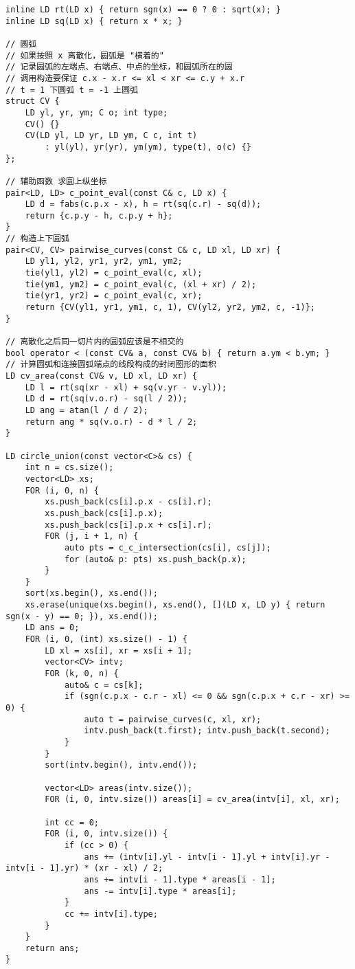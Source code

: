 \documentclass[]{article}
\begin{document}
\begin{verbatim}
inline LD rt(LD x) { return sgn(x) == 0 ? 0 : sqrt(x); }
inline LD sq(LD x) { return x * x; }

// 圆弧
// 如果按照 x 离散化，圆弧是 "横着的"
// 记录圆弧的左端点、右端点、中点的坐标，和圆弧所在的圆
// 调用构造要保证 c.x - x.r <= xl < xr <= c.y + x.r
// t = 1 下圆弧 t = -1 上圆弧
struct CV {
    LD yl, yr, ym; C o; int type;
    CV() {}
    CV(LD yl, LD yr, LD ym, C c, int t)
        : yl(yl), yr(yr), ym(ym), type(t), o(c) {}
};

// 辅助函数 求圆上纵坐标
pair<LD, LD> c_point_eval(const C& c, LD x) {
    LD d = fabs(c.p.x - x), h = rt(sq(c.r) - sq(d));
    return {c.p.y - h, c.p.y + h};
}
// 构造上下圆弧
pair<CV, CV> pairwise_curves(const C& c, LD xl, LD xr) {
    LD yl1, yl2, yr1, yr2, ym1, ym2;
    tie(yl1, yl2) = c_point_eval(c, xl);
    tie(ym1, ym2) = c_point_eval(c, (xl + xr) / 2);
    tie(yr1, yr2) = c_point_eval(c, xr);
    return {CV(yl1, yr1, ym1, c, 1), CV(yl2, yr2, ym2, c, -1)};
}

// 离散化之后同一切片内的圆弧应该是不相交的
bool operator < (const CV& a, const CV& b) { return a.ym < b.ym; }
// 计算圆弧和连接圆弧端点的线段构成的封闭图形的面积
LD cv_area(const CV& v, LD xl, LD xr) {
    LD l = rt(sq(xr - xl) + sq(v.yr - v.yl));
    LD d = rt(sq(v.o.r) - sq(l / 2));
    LD ang = atan(l / d / 2);
    return ang * sq(v.o.r) - d * l / 2;
}

LD circle_union(const vector<C>& cs) {
    int n = cs.size();
    vector<LD> xs;
    FOR (i, 0, n) {
        xs.push_back(cs[i].p.x - cs[i].r);
        xs.push_back(cs[i].p.x);
        xs.push_back(cs[i].p.x + cs[i].r);
        FOR (j, i + 1, n) {
            auto pts = c_c_intersection(cs[i], cs[j]);
            for (auto& p: pts) xs.push_back(p.x);
        }
    }
    sort(xs.begin(), xs.end());
    xs.erase(unique(xs.begin(), xs.end(), [](LD x, LD y) { return sgn(x - y) == 0; }), xs.end());
    LD ans = 0;
    FOR (i, 0, (int) xs.size() - 1) {
        LD xl = xs[i], xr = xs[i + 1];
        vector<CV> intv;
        FOR (k, 0, n) {
            auto& c = cs[k];
            if (sgn(c.p.x - c.r - xl) <= 0 && sgn(c.p.x + c.r - xr) >= 0) {
                auto t = pairwise_curves(c, xl, xr);
                intv.push_back(t.first); intv.push_back(t.second);
            }
        }
        sort(intv.begin(), intv.end());

        vector<LD> areas(intv.size());
        FOR (i, 0, intv.size()) areas[i] = cv_area(intv[i], xl, xr);

        int cc = 0;
        FOR (i, 0, intv.size()) {
            if (cc > 0) {
                ans += (intv[i].yl - intv[i - 1].yl + intv[i].yr - intv[i - 1].yr) * (xr - xl) / 2;
                ans += intv[i - 1].type * areas[i - 1];
                ans -= intv[i].type * areas[i];
            }
            cc += intv[i].type;
        }
    }
    return ans;
}
\end{verbatim}
\end{document}
